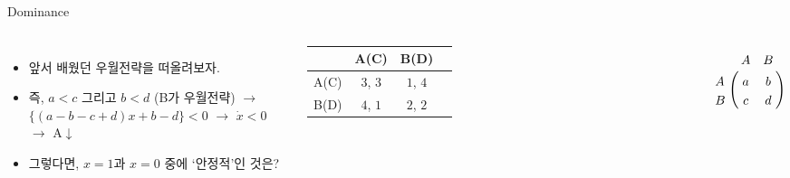 \documentclass[final]{beamer}
\begin{document}
\begin{frame}[t]{Dominance}
	\begin{columns}[c]
	\column{17em}
	\begin{itemize}
	\item 앞서 배웠던 우월전략을 떠올려보자. 
	\item 즉, $a<c$ 그리고 $b<d$ (B가 우월전략) $\rightarrow$ $\{(a-b-c+d)x + b-d \} < 0$
	$\rightarrow$ $\dot{x} < 0$ $\rightarrow$ A$\downarrow$
	\item 그렇다면, $x=1$과 $x=0$ 중에 `안정적'인 것은?
	\end{itemize}
	\column{14em}
	\hspace{-1em}
	\begin{table}
	\setlength{\tabcolsep}{1.2em}
	\begin{tabular}{|c|c|c|c|} \hline
	&  {A(C)} & {B(D)} \\ \hline
	{A(C)} & {$3$}, {$3$} & {$1$}, {$4$} \\ \hline%
	{B(D)} & {$4$}, {$1$} & {$2$}, {$2$} \\ 
	\hline
	\end{tabular}
	\end{table}
	\begin{align*}
	\bordermatrix{%
	   & A & B \cr
	A & a & b  \cr
	B & c & d  \cr
	}
	\end{align*}
	\end{columns}
\end{frame}
\end{document}

